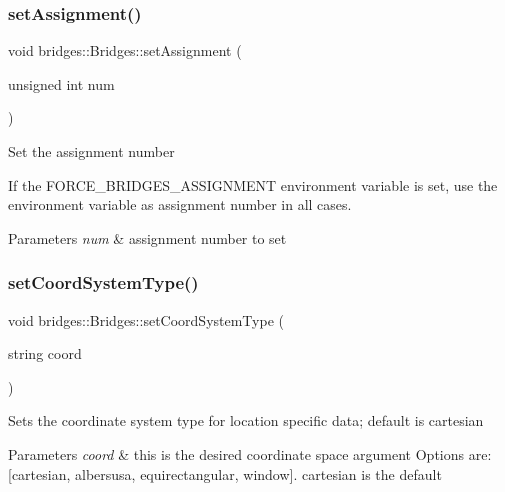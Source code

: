 \subsubsection{\texorpdfstring{setAssignment()}{setAssignment()}}
{\footnotesize\ttfamily void bridges\+::\+Bridges\+::set\+Assignment (\begin{DoxyParamCaption}\item[{unsigned int}]{num }\end{DoxyParamCaption})\hspace{0.3cm}{\ttfamily [inline]}}

Set the assignment number

If the F\+O\+R\+C\+E\+\_\+\+B\+R\+I\+D\+G\+E\+S\+\_\+\+A\+S\+S\+I\+G\+N\+M\+E\+NT environment variable is set, use the environment variable as assignment number in all cases.


\begin{DoxyParams}{Parameters}
{\em num} & assignment number to set \\
\hline
\end{DoxyParams}
\mbox{\label{classbridges_1_1_bridges_ad00c07d3a028110424909081a94c4013}} 
\subsubsection{\texorpdfstring{setCoordSystemType()}{setCoordSystemType()}}
{\footnotesize\ttfamily void bridges\+::\+Bridges\+::set\+Coord\+System\+Type (\begin{DoxyParamCaption}\item[{string}]{coord }\end{DoxyParamCaption})\hspace{0.3cm}{\ttfamily [inline]}}

Sets the coordinate system type for location specific data; default is cartesian


\begin{DoxyParams}{Parameters}
{\em coord} & this is the desired coordinate space argument Options are\+: \mbox{[}\textquotesingle{}cartesian\textquotesingle{}, \textquotesingle{}albersusa\textquotesingle{}, \textquotesingle{}equirectangular\textquotesingle{}, \textquotesingle{}window\textquotesingle{}\mbox{]}. \textquotesingle{}cartesian\textquotesingle{} is the default \\
\hline
\end{DoxyParams}
\mbox{\label{classbridges_1_1_bridges_a7447e2d5808c492d26132690c1a639a7}} 
